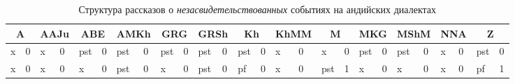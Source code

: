 \begin{table}[H]
\tiny
\caption{Структура рассказов о \textit{незасвидетельствованных} событиях на андийских диалектах}
\label{tab:andinarindirect}
\vspace{0.2cm}
\begin{center}
\begin{tabular}{llllllllllllllllllllllllll}
\multicolumn{2}{c}{A}                                   & \multicolumn{2}{c}{AAJu}                                & \multicolumn{2}{c}{ABE}                                 & \multicolumn{2}{c}{AMKh}                                & \multicolumn{2}{c}{GRG}                                 & \multicolumn{2}{c}{GRSh}                                & \multicolumn{2}{c}{Kh}                                  & \multicolumn{2}{c}{KhMM}                               & \multicolumn{2}{c}{M}                                   & \multicolumn{2}{c}{MKG}                                 & \multicolumn{2}{c}{MShM}                                & \multicolumn{2}{c}{NNA}                                 & \multicolumn{2}{c}{Z}                                   \\ \hline
\rowcolor[HTML]{C0C0C0} 
x                           & 0                         & x                           & 0                         & \cellcolor[HTML]{FFCCC9}pst & 0                         & \cellcolor[HTML]{FFCCC9}pst & 0                         & \cellcolor[HTML]{FFCCC9}pst & 0                         & \cellcolor[HTML]{FFCCC9}pst & 0                         & \cellcolor[HTML]{FFCCC9}pst & 0                         & x                          & 0                         & x                           & 0                         & \cellcolor[HTML]{FFCCC9}pst & 0                         & \cellcolor[HTML]{FFCCC9}pst & 0                         & x                           & 0                         & \cellcolor[HTML]{FFCCC9}pst & 0                         \\
\rowcolor[HTML]{C0C0C0} 
x                           & 0                         & x                           & 0                         & x                           & 0                         & \cellcolor[HTML]{FFCCC9}pst & 0                         & x                           & 0                         & \cellcolor[HTML]{FFCCC9}pst & 0                         & \cellcolor[HTML]{9AFF99}pf  & 0                         & x                          & 0                         & \cellcolor[HTML]{FFCCC9}pst & \cellcolor[HTML]{9AFF99}1 & x                           & 0                         & x                           & 0                         & x                           & 0                         & \cellcolor[HTML]{9AFF99}pf  & \cellcolor[HTML]{9AFF99}1 \\

\end{tabular}
\end{center}
\end{table}
